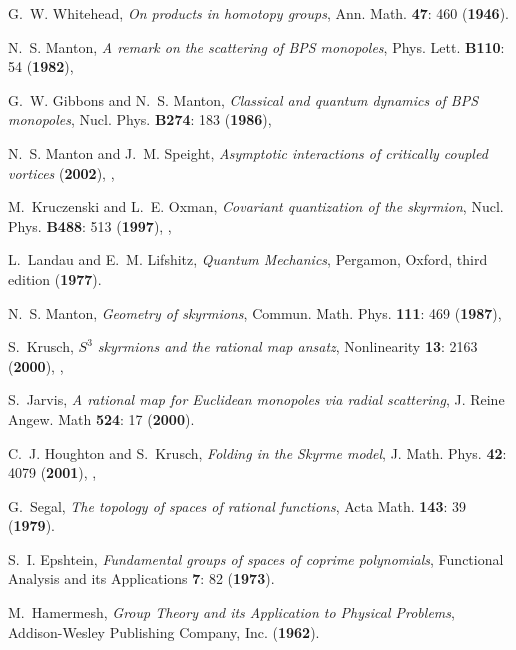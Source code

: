 \documentclass[a4paper,12pt]{article}
\begin{document}
\begin{small}
\begin{thebibliography}{10}
G.~W. Whitehead, {\em On products in homotopy groups\/}, Ann. Math. {\bf 47}:
  460
 ({\bf 1946}).

N.~S. Manton, {\em A remark on the scattering of {{BPS}} monopoles\/}, Phys.
  Lett. {\bf B110}: 54 ({\bf 1982}),

G.~W. Gibbons and N.~S. Manton, {\em Classical and quantum dynamics of {{BPS}}
  monopoles\/}, Nucl. Phys. {\bf B274}: 183 ({\bf 1986}),

N.~S. Manton and J.~M. Speight, {\em Asymptotic interactions of critically
  coupled vortices\/}  ({\bf 2002}), {},

M.~Kruczenski and L.~E. Oxman, {\em Covariant quantization of the skyrmion\/},
  Nucl. Phys. {\bf B488}: 513 ({\bf 1997}), {},

L.~Landau and E.~M. Lifshitz, {\em Quantum Mechanics\/}, Pergamon, Oxford,
  third edition
 ({\bf 1977}).

N.~S. Manton, {\em Geometry of skyrmions\/}, Commun. Math. Phys. {\bf 111}: 469
  ({\bf 1987}),

S.~Krusch, {\em ${S}^3$ skyrmions and the rational map ansatz\/}, Nonlinearity
  {\bf 13}: 2163 ({\bf 2000}), {},

S.~Jarvis, {\em A rational map for {E}uclidean monopoles via radial
  scattering\/}, J. Reine Angew. Math {\bf 524}: 17
 ({\bf 2000}).

C.~J. Houghton and S.~Krusch, {\em Folding in the {S}kyrme model\/}, J. Math.
  Phys. {\bf 42}: 4079 ({\bf 2001}), {},

G.~Segal, {\em The topology of spaces of rational functions\/}, Acta Math. {\bf
  143}: 39
 ({\bf 1979}).

S.~I. Epshtein, {\em Fundamental groups of spaces of coprime polynomials\/},
  Functional Analysis and its Applications {\bf 7}: 82
 ({\bf 1973}).

M.~Hamermesh, {\em Group Theory and its Application to Physical Problems\/},
  Addison-Wesley Publishing Company, Inc.
 ({\bf 1962}).


\end{thebibliography}
\end{small}
\end{document}
